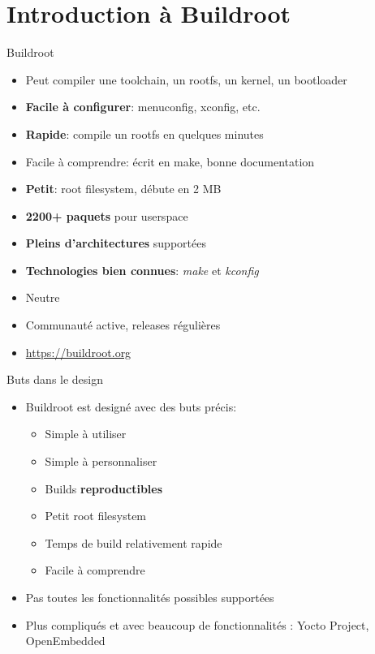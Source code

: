 \section{Introduction à Buildroot}

\begin{frame}{Buildroot}
  \begin{itemize}
  \item Peut compiler une toolchain, un rootfs, un kernel, un bootloader
  \item {\bf Facile à configurer}: menuconfig, xconfig, etc.
  \item {\bf Rapide}: compile un rootfs en quelques minutes
  \item Facile à comprendre: écrit en make, bonne documentation
  \item {\bf Petit}: root filesystem, débute en 2 MB
  \item {\bf 2200+ paquets} pour userspace
  \item {\bf Pleins d'architectures} supportées
  \item {\bf Technologies bien connues}: {\em make} et {\em kconfig}
  \item Neutre
  \item Communauté active, releases régulières
  \item \url{https://buildroot.org}
  \end{itemize}
\end{frame}

\begin{frame}{Buts dans le design}
  \begin{itemize}
  \item Buildroot est designé avec des buts précis:
    \begin{itemize}
    \item Simple à utiliser
    \item Simple à personnaliser
    \item Builds \textbf{reproductibles}
    \item Petit root filesystem
    \item Temps de build relativement rapide
    \item Facile à comprendre
    \end{itemize}
  \item Pas toutes les fonctionnalités possibles supportées
  \item Plus compliqués et avec beaucoup de fonctionnalités : Yocto Project, OpenEmbedded
  \end{itemize}
\end{frame}

